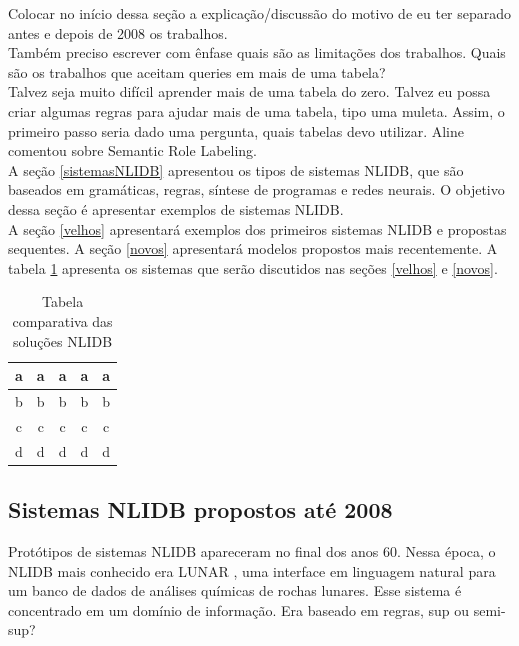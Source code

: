 \documentclass{article}
\begin{document}
Colocar no início dessa seção a explicação/discussão do motivo de eu ter separado antes e depois de 2008 os trabalhos.\\

Também preciso escrever com ênfase quais são as limitações dos trabalhos. Quais são os trabalhos que aceitam queries em mais de uma tabela?\\

Talvez seja muito difícil aprender mais de uma tabela do zero. Talvez eu possa criar algumas regras para ajudar mais de uma tabela, tipo uma muleta. Assim, o primeiro passo seria dado uma pergunta, quais tabelas devo utilizar. Aline comentou sobre Semantic Role Labeling.\\

A seção \ref{sistemasNLIDB} apresentou os tipos de sistemas NLIDB, que são baseados em gramáticas, regras, síntese de programas e redes neurais. O objetivo dessa seção é apresentar exemplos de sistemas NLIDB.\\

A seção \ref{velhos} apresentará exemplos dos primeiros sistemas NLIDB e propostas sequentes. A seção \ref{novos} apresentará modelos propostos mais recentemente. A tabela \ref{table:exemplos} apresenta os sistemas que serão discutidos nas seções \ref{velhos} e \ref{novos}.

\begin{table}[]
\centering
\begin{tabular}{|c|c|c|c|c|}
\hline
a & a & a & a & a \\ \hline
b & b & b & b & b \\ \hline
c & c & c & c & c \\ \hline
d & d & d & d & d \\ \hline
\end{tabular}
\caption{Tabela comparativa das soluções NLIDB}
\label{table:exemplos}
\end{table}

\subsection{Sistemas NLIDB propostos até 2008\label{velhos}}

Protótipos de sistemas NLIDB apareceram no final dos anos 60. Nessa época, o NLIDB mais conhecido era LUNAR \citep{woods1973progress}, uma interface em linguagem natural para um banco de dados de análises químicas de rochas lunares. Esse sistema é concentrado em um domínio de informação. Era baseado em regras, sup ou semi-sup?\\
\end{document}
